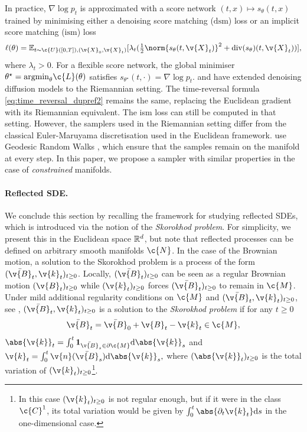 In practice, $\nabla \log p_t $ is approximated with a score network $(t,x) \mapsto s_\theta(t,x)$ trained by minimising either a denoising score matching ($\mathrm{dsm}$) loss or an implicit score matching ($\mathrm{ism}$) loss \parencite{vincent2011connection} \begin{equation} \label{eq:implicit_sm_dupref} \textstyle{ \ell(\theta) = \E_{t \sim \c{U}([0,T]), (\v{X}_0, \v{X}_t)}[ \lambda_t ( \frac{1}{2} \norm{ s_\theta(t, \v{X}_t) }^2 + \dive(s_\theta)(t, \v{X}_t))],} \end{equation} where $\lambda_t >0$.
For a flexible score network, the global minimiser $\theta^\star = \mathrm{argmin}_{\theta}\c{L}(\theta)$ satisfies $s_{\theta^\star}(t, \cdot)=\nabla \log p_t$.
\textcite{de2022riemannian}
and \textcite{huang2022riemannian} have extended denoising diffusion models to the
Riemannian setting.
The time-reversal formula \eqref{eq:time_reversal_dupref2} remains the same, replacing the Euclidean gradient with its Riemannian equivalent.
The \textrm{ism} loss can still be computed in that setting.
However, the samplers used in the Riemannian setting differ from the classical Euler-Maruyama discretisation used in the Euclidean framework.
\textcite{de2022riemannian}
use Geodesic Random Walks \parencite{jorgensen1975central}, which ensure that the
samples remain on the manifold at every step.
In this paper, we propose a sampler with similar properties in the case of \emph{constrained} manifolds.

\paragraph{Reflected SDE.}
We conclude this section by recalling the framework for studying reflected SDEs, which is introduced via the notion of the \emph{Skorokhod problem}.
For simplicity, we present this in the Euclidean space $\mathbb{R}^d$, but note that reflected processes can be defined on arbitrary smooth manifolds $\c{N}$.
In the case of the Brownian motion, a solution to the Skorokhod problem is a process of the form $(\bar{\v{B}}_t, \v{k}_t)_{t \geq 0}$.
Locally, $(\bar{\v{B}}_t)_{t \geq 0}$ can be seen as a regular Brownian motion $(\v{B}_t)_{t \geq 0}$ while $(\v{k}_t)_{t \geq 0}$ forces $(\bar{\v{B}}_t)_{t \geq 0}$ to remain in $\c{M}$.
Under mild additional regularity conditions on $\c{M}$ and $(\bar{\v{B}}_t, \v{k}_t)_{t \geq 0}$, see \cite{skorokhod1961stochastic}, $(\bar{\v{B}}_t, \v{k}_t)_{t \geq 0}$ is a solution to the \emph{Skorokhod problem} if for any $t \geq 0$ \begin{equation} \label{eq:rbm_dupref} \bar{\v{B}}_t = \bar{\v{B}}_0 + \v{B}_t - \v{k}_t \in \c{M}, \end{equation} $\textstyle{\abs{\v{k}}_t = \int_0^t \mathbf{1}_{\bar{\v{B}}_s \in \partial \c{M}} \mathrm{d} \abs{\v{k}}_s}$ and $\textstyle{\v{k}_t = \int_0^t \v{n}(\bar{\v{B}}_s) \mathrm{d} \abs{\v{k}}_s ,}$ where $(\abs{\v{k}}_t)_{t \geq 0}$ is the total variation of $(\v{k}_t)_{t \geq 0}$\footnote{In this case $(\v{k}_t)_{t \geq 0}$ is not regular enough, but if it were in the class $\c{C}^1$, its total variation would be given by $\int_0^t \abs{\partial_t \v{k}_t} \mathrm{d} s$ in the one-dimensional case.
}.

